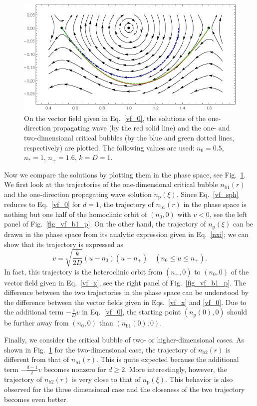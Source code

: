 \documentclass{article}
\begin{document}
\begin{figure}
\centering
\includegraphics[width=0.5\linewidth]{fig1/vector_field_half.png}
\caption{\label{fig_vf_half}On the vector field given in Eq.~\eqref{vf_0}, the solutions of the one-direction propagating wave (by the red solid line) and the one- and two-dimensional critical bubbles (by the blue and green dotted lines, respectively) are plotted. The following values are used: $n_0=0.5$, $n_*=1$, $n_+=1.6$, $k=D=1$.}
\end{figure}

Now we compare the solutions by plotting them in the phase space, see Fig.~\ref{fig_vf_half}.
We first look at the trajectories of the one-dimensional critical bubble $n_\mathrm{b1}(r)$ and the one-direction propagating wave solution $n_\mathrm{p}(\xi)$.
Since Eq.~\eqref{vf_sph} reduces to Eq.~\eqref{vf_0} for $d=1$, the trajectory of $n_\mathrm{b1}(r)$ in the phase space is nothing but one half of the homoclinic orbit of $(n_0,0)$ with $v<0$, see the left panel of Fig.~\ref{fig_vf_b1_p}.
On the other hand, the trajectory of $n_\mathrm{p}(\xi)$ can be drawn in the phase space from its analytic expression given in Eq.~\eqref{nxi};
we can show that its trajectory is expressed as
\begin{equation}
v= \sqrt{\frac{k}{2D}}(u-n_0)(u-n_+)\quad(n_0\le u\le n_+).
\end{equation}
In fact, this trajectory is the heteroclinic orbit from $(n_+,0)$ to $(n_0,0)$ of the vector field given in Eq.~\eqref{vf_x}, see the right panel of Fig.~\ref{fig_vf_b1_p}.
The difference between the two trajectories in the phase space can be understood by the difference between the vector fields given in Eqs.~\eqref{vf_x} and \eqref{vf_0}.
Due to the additional term $-\frac{c}{D}v$ in Eq.~\eqref{vf_0}, the starting point $(n_\mathrm{p}(0),0)$ should be further away from $(n_0,0)$ than $(n_\mathrm{b1}(0),0)$.

Finally, we consider the critical bubble of two- or higher-dimensional cases.
As shown in Fig.~\ref{fig_vf_half} for the two-dimensional case, the trajectory of $n_\mathrm{b2}(r)$ is different from that of $n_\mathrm{b1}(r)$. 
This is quite expected because the additional term $-\frac{d-1}{t}v$ becomes nonzero for $d\ge2$.
More interestingly, however, the trajectory of $n_\mathrm{b2}(r)$ is very close to that of $n_\mathrm{p}(\xi)$.
This behavior is also observed for the three dimensional case and the closeness of the two trajectory becomes even better.
\end{document}
